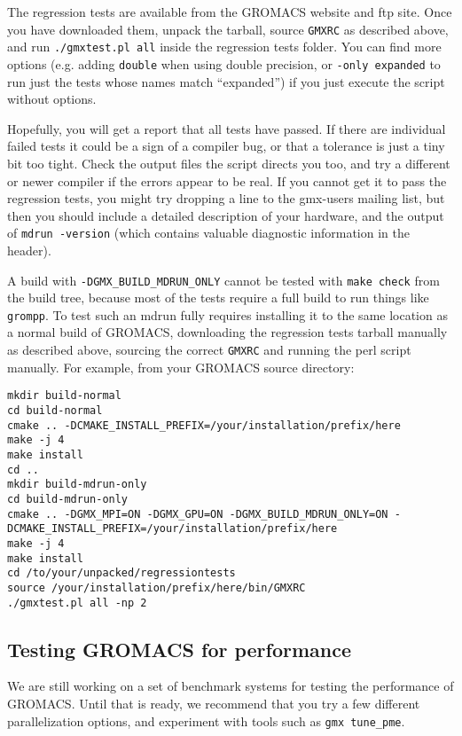 \documentclass{article}[12pt,a4paper,twoside]
\newcommand{\gromacs}{GROMACS}
\begin{document}
\begin{enumerate}
The regression tests are available from the \gromacs{} website and ftp
site.  Once you have downloaded them, unpack the tarball, source
\verb+GMXRC+ as described above, and run \verb+./gmxtest.pl all+
inside the regression tests folder. You can find more options
(e.g. adding \verb+double+ when using double precision, or
\verb+-only expanded+ to run just the tests whose names match
``expanded'') if you just execute the script without options.

Hopefully, you will get a report that all tests have passed. If there
are individual failed tests it could be a sign of a compiler bug, or
that a tolerance is just a tiny bit too tight. Check the output files
the script directs you too, and try a different or newer compiler if
the errors appear to be real. If you cannot get it to pass the
regression tests, you might try dropping a line to the gmx-users
mailing list, but then you should include a detailed description of
your hardware, and the output of \verb+mdrun -version+ (which contains
valuable diagnostic information in the header).

A build with \verb+-DGMX_BUILD_MDRUN_ONLY+ cannot be tested with
\verb+make check+ from the build tree, because most of the tests
require a full build to run things like \verb+grompp+. To test such an
mdrun fully requires installing it to the same location as a normal
build of \gromacs{}, downloading the regression tests tarball manually
as described above, sourcing the correct \verb+GMXRC+ and running the
perl script manually. For example, from your \gromacs{} source
directory:
\begin{verbatim}
mkdir build-normal
cd build-normal
cmake .. -DCMAKE_INSTALL_PREFIX=/your/installation/prefix/here
make -j 4
make install
cd ..
mkdir build-mdrun-only
cd build-mdrun-only
cmake .. -DGMX_MPI=ON -DGMX_GPU=ON -DGMX_BUILD_MDRUN_ONLY=ON -DCMAKE_INSTALL_PREFIX=/your/installation/prefix/here
make -j 4
make install
cd /to/your/unpacked/regressiontests
source /your/installation/prefix/here/bin/GMXRC
./gmxtest.pl all -np 2
\end{verbatim}

\subsection{Testing \gromacs{} for performance}
We are still working on a set of benchmark systems for testing
the performance of \gromacs{}. Until that is ready, we recommend that
you try a few different parallelization options, and experiment with
tools such as \verb+gmx tune_pme+.


\end{enumerate}
\end{document}
